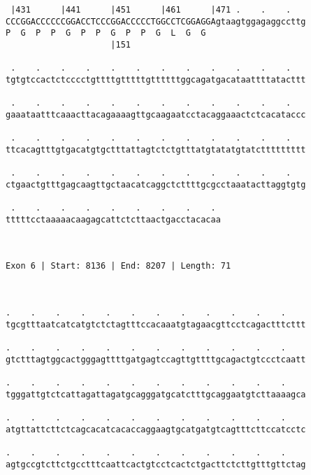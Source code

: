 \documentclass{article}
\begin{document}
\begin{Verbatim}
 |431      |441      |451      |461      |471 .    .    .   
CCCGGACCCCCCGGACCTCCCGGACCCCCTGGCCTCGGAGGAgtaagtggagaggccttg
P  G  P  P  G  P  P  G  P  P  G  L  G  G                    
                     |151                                   
  
 .    .    .    .    .    .    .    .    .    .    .    .   
tgtgtccactctcccctgttttgtttttgttttttggcagatgacataattttatacttt
                                                            
 .    .    .    .    .    .    .    .    .    .    .    .   
gaaataatttcaaacttacagaaaagttgcaagaatcctacaggaaactctcacataccc
                                                            
 .    .    .    .    .    .    .    .    .    .    .    .   
ttcacagtttgtgacatgtgctttattagtctctgtttatgtatatgtatcttttttttt
                                                            
 .    .    .    .    .    .    .    .    .    .    .    .   
ctgaactgtttgagcaagttgctaacatcaggctcttttgcgcctaaatacttaggtgtg
                                                            
 .    .    .    .    .    .    .    .    . 
tttttcctaaaaacaagagcattctcttaactgacctacacaa
                                           
                                           
 
Exon 6 | Start: 8136 | End: 8207 | Length: 71



.    .    .    .    .    .    .    .    .    .    .    .    
tgcgtttaatcatcatgtctctagtttccacaaatgtagaacgttcctcagactttcttt
                                                            
.    .    .    .    .    .    .    .    .    .    .    .    
gtctttagtggcactgggagttttgatgagtccagttgttttgcagactgtccctcaatt
                                                            
.    .    .    .    .    .    .    .    .    .    .    .    
tgggattgtctcattagattagatgcagggatgcatctttgcaggaatgtcttaaaagca
                                                            
.    .    .    .    .    .    .    .    .    .    .    .    
atgttattcttctcagcacatcacaccaggaagtgcatgatgtcagtttcttccatcctc
                                                            
.    .    .    .    .    .    .    .    .    .    .    .    
agtgccgtcttctgcctttcaattcactgtcctcactctgacttctcttgtttgttctag
                                                            

\end{Verbatim}
\end{document}
